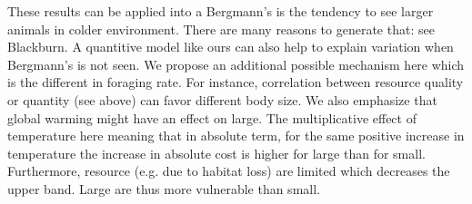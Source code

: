 These results can be applied into a Bergmann's is the tendency to see larger animals in colder environment.
There are many reasons to generate that: see Blackburn.
A quantitive model like ours can also help to explain variation when Bergmann's is not seen.
We propose an additional possible mechanism here which is the different in foraging rate.
For instance, correlation between resource quality or quantity (see above) can favor different body size.
We also emphasize that global warming might have an effect on large.
The multiplicative effect of temperature here meaning that in absolute term, for the same positive increase in temperature the increase in absolute cost is higher for large than for small.
Furthermore,  resource (e.g. due to habitat loss) are limited  which decreases the upper band. 
Large are thus more vulnerable than small. 


%

